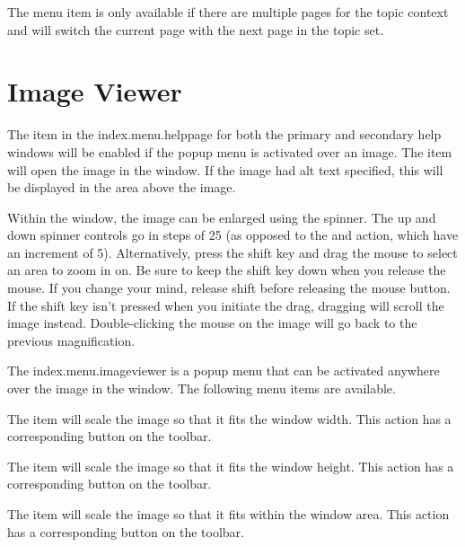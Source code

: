 The  menu item is only
available if there are multiple pages for the topic context and will
switch the current page with the next page in the topic set.

\section{Image Viewer}
\label{sec:helpimageviewer}

The  item in the \gls{index.menu.helppage} for both the
primary and secondary help windows will be enabled if the popup menu
is activated over an image. The  item will
open the image in the  window.
If the image had alt text specified, this will be displayed in the
area above the image.

Within the  window, the image can be enlarged
using the  spinner. The up and down
spinner controls go in steps of 25 (as opposed to the
 and 
action, which have an increment of 5). Alternatively, press the
shift key  and drag the mouse to select an area to
zoom in on. Be sure to keep the shift key down when you release the
mouse. If you change your mind, release shift before releasing the
mouse button. If the shift key isn't pressed when you initiate the
drag, dragging will scroll the image instead. Double-clicking the
mouse on the image will go back to the previous magnification.


The \gls{index.menu.imageviewer} is a popup menu that can
be activated anywhere over the image in the 
window. The following menu items are available.


The  item will scale the image so
that it fits the window width. This action has a corresponding
button on the toolbar.


The  item will scale the image so
that it fits the window height. This action has a corresponding
button on the toolbar.


The  item will scale the image so
that it fits within the window area. This action has a corresponding
button on the toolbar.

